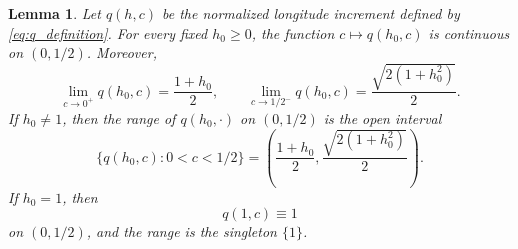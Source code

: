 \documentclass[10pt,a4paper]{amsart}
\newtheorem{lem}{Lemma}
\begin{document}
\begin{lem}\label{lem:q_range}
Let $q(h,c)$ be the normalized longitude increment defined by
\eqref{eq:q_definition}. For every fixed $h_0\geq0$, the function
$c\mapsto q(h_0,c)$ is continuous on $(0,1/2)$. Moreover,
\begin{equation}\label{eq:q_endpoint_limits}
\lim_{c\to0^+}q(h_0,c)=\frac{1+h_0}{2},
\qquad
\lim_{c\to1/2^-}q(h_0,c)=\frac{\sqrt{2(1+h_0^2)}}{2}.
\end{equation}
If $h_0\neq1$, then the range of $q(h_0,\cdot)$ on $(0,1/2)$ is the open
interval
\begin{equation}\label{eq:q_range_interval}
\bigl\{q(h_0,c):0<c<1/2\bigr\}
=
\left(
\frac{1+h_0}{2},
\frac{\sqrt{2(1+h_0^2)}}{2}
\right).
\end{equation}
If $h_0=1$, then
\begin{equation}\label{eq:q_pitch_one}
q(1,c)\equiv1
\end{equation}
on $(0,1/2)$, and the range is the singleton $\{1\}$.
\end{lem}
\end{document}
